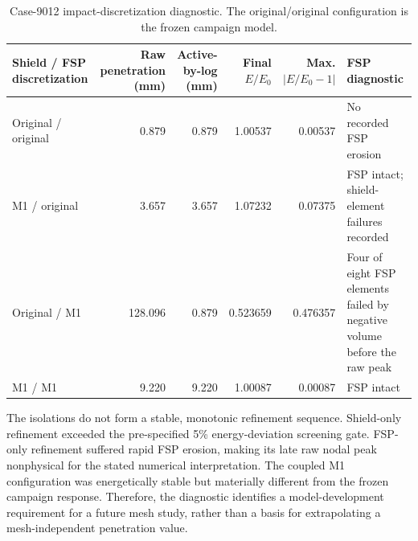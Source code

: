 \documentclass[11pt]{article}
\begin{document}
\begin{landscape}
\begin{table}[H]
\centering
\small
\caption{Case-9012 impact-discretization diagnostic. The original/original configuration is the frozen campaign model.}\label{tab:s4-mesh}
\begin{tabular}{p{}rrrrp{}}
\toprule
Shield / FSP discretization & \shortstack{Raw penetration\\(mm)} & \shortstack{Active-by-log\\(mm)} & \shortstack{Final\\$E/E_0$} & \shortstack{Max.\\$|E/E_0-1|$} & FSP diagnostic \\
\midrule
Original / original & 0.879 & 0.879 & 1.00537 & 0.00537 & No recorded FSP erosion \\
M1 / original & 3.657 & 3.657 & 1.07232 & 0.07375 & FSP intact; shield-element failures recorded \\
Original / M1 & 128.096 & 0.879 & 0.523659 & 0.476357 & Four of eight FSP elements failed by negative volume before the raw peak \\
M1 / M1 & 9.220 & 9.220 & 1.00087 & 0.00087 & FSP intact \\
\bottomrule
\end{tabular}
\end{table}
\end{landscape}

The isolations do not form a stable, monotonic refinement sequence. Shield-only refinement exceeded the pre-specified 5\% energy-deviation screening gate. FSP-only refinement suffered rapid FSP erosion, making its late raw nodal peak nonphysical for the stated numerical interpretation. The coupled M1 configuration was energetically stable but materially different from the frozen campaign response. Therefore, the diagnostic identifies a model-development requirement for a future mesh study, rather than a basis for extrapolating a mesh-independent penetration value.



\end{document}
